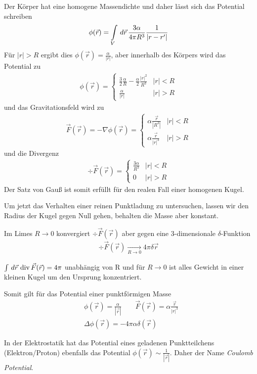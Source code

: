 \par
Der Körper hat eine homogene Massendichte und daher lässt sich das Potential
schreiben
\begin{align*}
\phi(\vec{r}) = \int \limits_{V}\,d\vec{r}\, \frac{3\alpha}{4\pi
R^3}\frac{1}{|r-r'|}
\end{align*}
Für $|r| > R$ ergibt dies $\phi(\vec{r}) = \frac{\alpha}{|r|}$, aber innerhalb
des Körpers wird das Potential zu
\begin{align*}
\phi(\vec{r}) =
\begin{cases}\frac{3}{2}\frac{\alpha}{R}-\frac{\alpha}{2}\frac{|r|^2}{R^3} &
|r| < R
\\
\frac{\alpha}{|r|} & |r| > R\end{cases}
\end{align*}
und das Gravitationsfeld wird zu
\begin{align*}
\vec{F}(\vec{r}) = -\nabla\phi(\vec{r}) = 
\begin{cases}\alpha\frac{\vec{r}}{|R^3|} & |r| < R \\
\alpha\frac{\vec{r}}{|r|^3} & |r| > R\end{cases}
\end{align*}
und die Divergenz
\begin{align*}
\div \vec{F}(\vec{r}) = \begin{cases}\frac{3\alpha}{R^3} & |r| < R \\
0 & |r| > R\end{cases}
\end{align*}
Der Satz von Gauß ist somit erfüllt für den realen Fall einer homogenen Kugel.
\par
Um jetzt das Verhalten einer reinen Punktladung zu untersuchen, lassen wir den
Radius der Kugel gegen Null gehen, behalten die Masse aber konstant.
\par
Im Limes $R\to0$ konvergiert $\div \vec{F}(\vec{r})$ aber gegen eine
$3$-dimensionale $\delta$-Funktion
\begin{align*}
\div \vec{F}(\vec{r}) \underset{R\to0}{\rightarrow} 4\pi\delta{\vec{r}}
\end{align*}
\begin{info}
$\int \,d\vec{r}\, \operatorname{div}\vec{F}(\vec{r}) = 4\pi$ unabhängig von R und für $R\to0$
ist alles Gewicht in einer kleinen Kugel um den Ursprung konzentriert.
\end{info}
\par
Somit gilt für das Potential einer punktförmigen Masse
\begin{align*}
&\phi(\vec{r}) = \frac{\alpha}{|\vec{r}|}\qquad \vec{F}(\vec{r}) =
\alpha\frac{\vec{r}}{|r|^3}\\
&\Delta\phi(\vec{r}) = -4\pi\alpha\delta(\vec{r}) 
\end{align*}
\begin{Bemerkung}
In der Elektrostatik hat das Potential eines geladenen Punktteilchens
(Elektron/Proton) ebenfalls das Potential
$\phi(\vec{r})\sim\frac{1}{|\vec{r}|}$. Daher der Name {\em Coulomb Potential}.
\end{Bemerkung}
